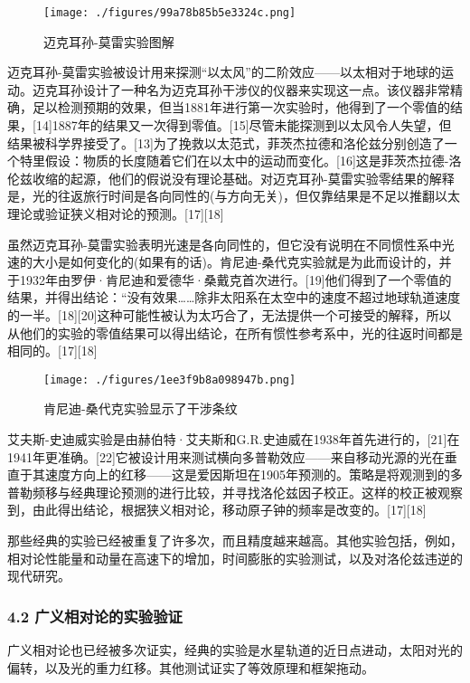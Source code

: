 \begin{figure}[ht]
\centering
\texttt{[image: ./figures/99a78b85b5e3324c.png]}
\caption{迈克耳孙-莫雷实验图解} \label{fig_XDL_2}
\end{figure}

迈克耳孙-莫雷实验被设计用来探测“以太风”的二阶效应——以太相对于地球的运动。迈克耳孙设计了一种名为迈克耳孙干涉仪的仪器来实现这一点。该仪器非常精确，足以检测预期的效果，但当1881年进行第一次实验时，他得到了一个零值的结果，[14]1887年的结果又一次得到零值。[15]尽管未能探测到以太风令人失望，但结果被科学界接受了。[13]为了挽救以太范式，菲茨杰拉德和洛伦兹分别创造了一个特里假设：物质的长度随着它们在以太中的运动而变化。[16]这是菲茨杰拉德-洛伦兹收缩的起源，他们的假说没有理论基础。对迈克耳孙-莫雷实验零结果的解释是，光的往返旅行时间是各向同性的(与方向无关)，但仅靠结果是不足以推翻以太理论或验证狭义相对论的预测。[17][18]

虽然迈克耳孙-莫雷实验表明光速是各向同性的，但它没有说明在不同惯性系中光速的大小是如何变化的(如果有的话)。肯尼迪-桑代克实验就是为此而设计的，并于1932年由罗伊·肯尼迪和爱德华·桑戴克首次进行。[19]他们得到了一个零值的结果，并得出结论：“没有效果……除非太阳系在太空中的速度不超过地球轨道速度的一半。[18][20]这种可能性被认为太巧合了，无法提供一个可接受的解释，所以从他们的实验的零值结果可以得出结论，在所有惯性参考系中，光的往返时间都是相同的。[17][18]

\begin{figure}[ht]
\centering
\texttt{[image: ./figures/1ee3f9b8a098947b.png]}
\caption{肯尼迪-桑代克实验显示了干涉条纹} \label{fig_XDL_3}
\end{figure}

艾夫斯-史迪威实验是由赫伯特·艾夫斯和G.R.史迪威在1938年首先进行的，[21]在1941年更准确。[22]它被设计用来测试横向多普勒效应——来自移动光源的光在垂直于其速度方向上的红移——这是爱因斯坦在1905年预测的。策略是将观测到的多普勒频移与经典理论预测的进行比较，并寻找洛伦兹因子校正。这样的校正被观察到，由此得出结论，根据狭义相对论，移动原子钟的频率是改变的。[17][18]

那些经典的实验已经被重复了许多次，而且精度越来越高。其他实验包括，例如，相对论性能量和动量在高速下的增加，时间膨胀的实验测试，以及对洛伦兹违逆的现代研究。

\subsubsection{4.2 广义相对论的实验验证}

广义相对论也已经被多次证实，经典的实验是水星轨道的近日点进动，太阳对光的偏转，以及光的重力红移。其他测试证实了等效原理和框架拖动。

